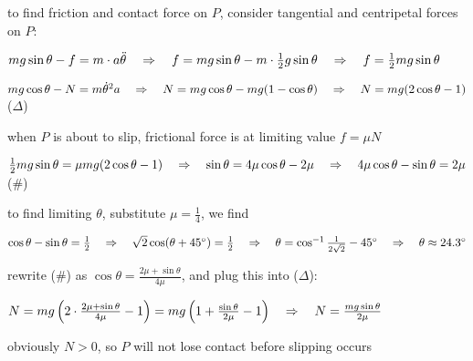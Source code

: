 to find friction and contact force on $P$, consider tangential and centripetal forces on $P$:

{

\centering

$mg\sin\theta - f = m\cdot a\ddot{\theta} \quad \Rightarrow \quad f = mg\sin\theta - m\cdot \frac{1}{2}g\sin\theta \quad \Rightarrow \quad f= \frac{1}{2}mg\sin\theta$

$mg\cos\theta - N = m\dot{\theta}^2 a \quad \Rightarrow \quad N = mg\cos\theta - mg(1-\cos\theta) \quad \Rightarrow \quad N = mg(2\cos\theta -1) $ ($\Delta$)

}

when $P$ is about to slip, frictional force is at limiting value $f=\mu N$

{

\centering

$\frac{1}{2}mg\sin\theta = \mu mg(2\cos\theta -1) \quad \Rightarrow \quad \sin\theta = 4\mu\cos\theta -2\mu \quad \Rightarrow \quad 4\mu\cos\theta -\sin\theta = 2\mu$ (\#)

}

to find limiting $\theta$, substitute $\mu=\frac{1}{4}$, we find

{

\centering

$\cos\theta - \sin\theta = \frac{1}{2} \quad \Rightarrow \quad \sqrt{2}\cos(\theta+45^\circ)=\frac{1}{2} \quad \Rightarrow \quad \theta = \cos^{-1}\tfrac{1}{2\sqrt{2}} - 45^\circ \quad \Rightarrow \quad \theta \approx 24.3^\circ$

}

rewrite (\#) as $\cos\theta = \frac{2\mu+\sin\theta}{4\mu}$, and plug this into ($\Delta$):

{

\centering

$N = mg\left(2\cdot \frac{2\mu+\sin\theta}{4\mu} - 1\right) = mg\left(1 + \frac{\sin\theta}{2\mu} -1 \right) \quad \Rightarrow \quad N = \frac{mg\sin\theta}{2\mu}$

}

obviously $N>0$, so $P$ will not lose contact before slipping occurs \eoe